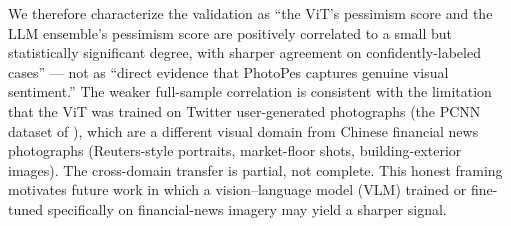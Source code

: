 \documentclass[AER]{AEA}
\begin{document}
We therefore characterize the validation as ``the ViT's pessimism score and the LLM ensemble's pessimism score are positively correlated to a small but statistically significant degree, with sharper agreement on confidently-labeled cases'' --- not as ``direct evidence that PhotoPes captures genuine visual sentiment.'' The weaker full-sample correlation is consistent with the limitation that the ViT was trained on Twitter user-generated photographs (the PCNN dataset of \citet{you2015robust}), which are a different visual domain from Chinese financial news photographs (Reuters-style portraits, market-floor shots, building-exterior images). The cross-domain transfer is partial, not complete. This honest framing motivates future work in which a vision--language model (VLM) trained or fine-tuned specifically on financial-news imagery may yield a sharper signal.
\end{document}
